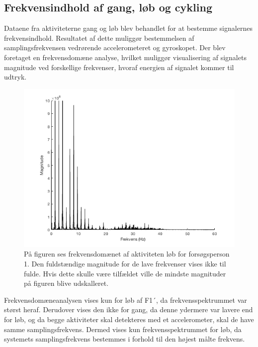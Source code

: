 \subsection{Frekvensindhold af gang, løb og cykling}
Dataene fra aktiviteterne gang og løb blev behandlet for at bestemme signalernes frekvensindhold. Resultatet af dette muliggør bestemmelsen af samplingsfrekvensen vedrørende accelerometeret og gyroskopet. Der blev foretaget en frekvensdomæne analyse, hvilket muliggør visualisering af signalets magnitude ved forskellige frekvenser, hvoraf energien af signalet kommer til udtryk.
\begin{figure}[H]
	\centering
	\includegraphics[scale=0.68]{figures/qBilag/fft_f1_loeb}
	\caption{På figuren ses frekvensdomænet af aktiviteten løb for forsøgsperson 1. Den fuldstændige magnitude for de lave frekvenser vises ikke til fulde. Hvis dette skulle være tilfældet ville de mindste magnituder på figuren blive udskalleret.}
	\label{fig:Ap_FFt}
\end{figure}
Frekvensdomæneanalysen vises kun for løb af F1´, da frekvensspektrummet var størst heraf. Derudover vises den ikke for gang, da denne ydermere var lavere end for løb, og da begge aktiviteter skal detekteres med et accelerometer, skal de have samme samplingsfrekvens. Dermed vises kun frekvensspektrummet for løb, da systemets samplingsfrekvens bestemmes i forhold til den højest målte frekvens.


